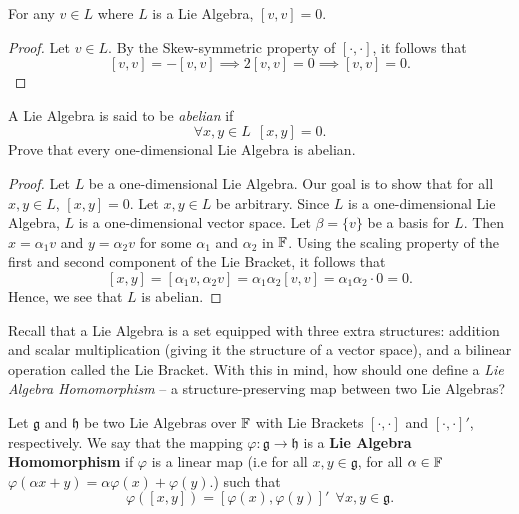 \documentclass[a4paper]{article}
\begin{document}
\begin{lemma}
    For any \( v \in L  \) where \( L  \) is a Lie Algebra, \( [v,v] = 0  \). 
\end{lemma}
\begin{proof}
    Let \( v \in L  \). By the Skew-symmetric property of \( [\cdot, \cdot] \), it follows that 
    \[  [v,v] = - [v,v] \implies 2[v,v] = 0 \implies [v,v] = 0.   \]
\end{proof}

\begin{problem}
    A Lie Algebra is said to be \textit{abelian} if
    \[  \forall x ,y \in L  \ \ [x,y] = 0.  \]
    Prove that every one-dimensional Lie Algebra is abelian.
\end{problem} 
\begin{proof}
    Let \( L  \) be a one-dimensional Lie Algebra. Our goal is to show that for all \( x,y \in L  \), \( [x,y] = 0 \). Let \( x,y \in L  \) be arbitrary. Since \( L  \) is a one-dimensional Lie Algebra, \( L  \) is a one-dimensional vector space. Let \( \beta = \{ v  \}  \) be a basis for \( L  \). Then \( x = {\alpha}_{1} v  \) and \( y = {\alpha}_{2} v  \) for some \( {\alpha}_{1} \) and \( {\alpha}_{2} \) in \( \mathbb{F}  \). Using the scaling property of the first and second component of the Lie Bracket, it follows that 
    \[ [x,y] = [{\alpha}_{1}v, {\alpha}_{2} v  ] = {\alpha}_{1} {\alpha}_{2} [v,v] = {\alpha}_{1} {\alpha}_{2} \cdot 0 = 0.   \] 
    Hence, we see that \( L  \) is abelian.
\end{proof}

\begin{problem}
    Recall that a Lie Algebra is a set equipped with three extra structures: addition and scalar multiplication (giving it the structure of a vector space), and a bilinear operation called the Lie Bracket. With this in mind, how should one define a \textit{Lie Algebra Homomorphism} -- a structure-preserving map between two Lie Algebras?
\end{problem}
\begin{definition}
    Let \( \mathfrak{g} \) and \( \mathfrak{h} \) be two Lie Algebras over \( \mathbb{F}  \) with Lie Brackets \( [\cdot, \cdot]  \) and \( [\cdot, \cdot]' \), respectively. We say that the mapping \( \varphi : \mathfrak{g} \to \mathfrak{h} \) is a \textbf{Lie Algebra Homomorphism} if \( \varphi  \) is a linear map (i.e for all \( x,y \in \mathfrak{g}  \), for all \( \alpha \in \mathbb{F}  \) \( \varphi(\alpha x + y) = \alpha \varphi(x) + \varphi(y) \).) such that
    \[  \varphi([x,y]) = [\varphi(x), \varphi(y)]' \ \ \forall x,y \in \mathfrak{g}.\]
\end{definition}
\end{document}
